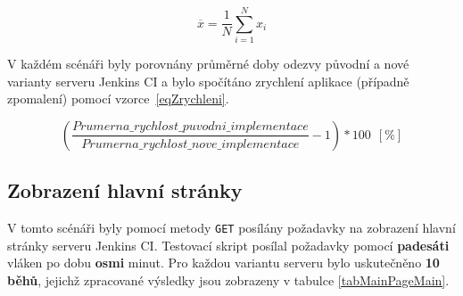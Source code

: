             \begin{equation}\label{eqPrumer}
                \overline{x} = \frac{1}{N}\sum_{i=1}^Nx_i
            \end{equation}
            \medskip

            V každém scénáři byly porovnány průměrné doby odezvy původní a nové
            varianty serveru Jenkins CI a bylo spočítáno zrychlení aplikace (případně zpomalení) pomocí vzorce~\ref{eqZrychleni}.

            \begin{equation}\label{eqZrychleni}
                \left(\frac{Prumerna\_rychlost\_puvodni\_implementace}{Prumerna\_rychlost\_nove\_implementace} - 1\right)* 100 ~~ [\%]
            \end{equation}
            \medskip


        \subsection{Zobrazení hlavní stránky}
            V tomto scénáři byly pomocí metody \texttt{GET} posílány požadavky na zobrazení hlavní 
            stránky serveru Jenkins CI. Testovací skript posílal požadavky pomocí \textbf{padesáti} vláken po dobu \textbf{osmi} minut.
            Pro každou variantu serveru bylo uskutečněno \textbf{10 běhů}, 
            jejichž zpracované výsledky jsou zobrazeny v tabulce \ref{tabMainPageMain}.

